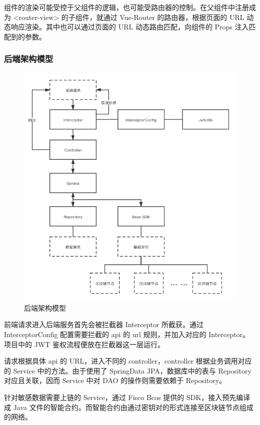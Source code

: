 组件的渲染可能受控于父组件的逻辑，也可能受路由器的控制。在父组件中注册成为 <router-view> 的子组件，就通过 Vue-Router 的路由器，根据页面的 URL 动态响应渲染。其中也可以通过页面的 URL 动态路由匹配，向组件的 Props 注入匹配到的参数。


\subsubsection{后端架构模型}
\begin{figure}[htb]
    \centering
    \includegraphics[width=0.85\linewidth]{_images/后端模型.png}
    \caption{后端架构模型}
\end{figure}
前端请求进入后端服务首先会被拦截器 Interceptor 所截获。通过 InterceptorConfig 配置需要拦截的 api 的 url 规则，并加入对应的 Interceptor。项目中的 JWT 鉴权流程便放在拦截器这一层运行。

请求根据具体 api 的 URL，进入不同的 controller，controller 根据业务调用对应的 Service 中的方法。由于使用了 SpringData JPA，数据库中的表与 Repository 对应且关联，因而 Service 中对 DAO 的操作则需要依赖于 Repository。

针对敏感数据需要上链的 Service，通过 Fisco Bcos 提供的 SDK，接入预先编译成 Java 文件的智能合约。而智能合约由通过密钥对的形式连接至区块链节点组成的网络。

